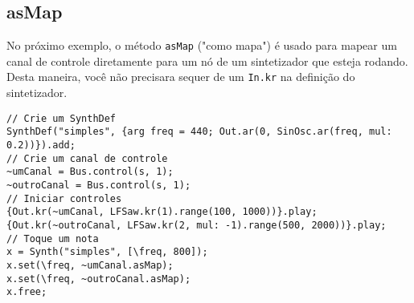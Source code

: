 \subsection{asMap}

No próximo exemplo, o método \texttt{asMap} ("como mapa") é usado para mapear um canal de controle diretamente para um nó de um sintetizador que esteja rodando. Desta maneira, você não precisara sequer de um \texttt{In.kr} na definição do sintetizador.

\begin{lstlisting}[style=SuperCollider-IDE, basicstyle=\scttfamily\footnotesize]
// Crie um SynthDef
SynthDef("simples", {arg freq = 440; Out.ar(0, SinOsc.ar(freq, mul: 0.2))}).add;
// Crie um canal de controle
~umCanal = Bus.control(s, 1);
~outroCanal = Bus.control(s, 1);
// Iniciar controles
{Out.kr(~umCanal, LFSaw.kr(1).range(100, 1000))}.play;
{Out.kr(~outroCanal, LFSaw.kr(2, mul: -1).range(500, 2000))}.play;
// Toque um nota
x = Synth("simples", [\freq, 800]);
x.set(\freq, ~umCanal.asMap);
x.set(\freq, ~outroCanal.asMap);
x.free;
\end{lstlisting}
